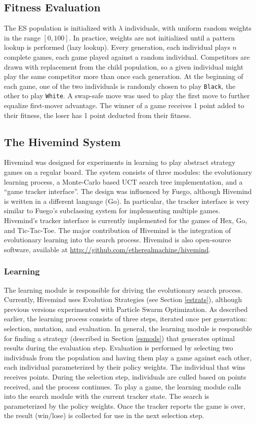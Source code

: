 \documentclass[11pt]{report}
\newcommand{\black}{\texttt{Black}}
\newcommand{\white}{\texttt{White}}
\begin{document}
\subsection{Fitness Evaluation}\label{fitness}
The ES population is initialized with $\lambda$ individuals, with uniform random weights in the range $[0, 100]$. In practice, weights are not initialized until a pattern lookup is performed (lazy lookup). Every generation, each individual plays $n$ complete games, each game played against a random individual. Competitors are drawn with replacement from the child population, so a given individual might play the same competitor more than once each generation. At the beginning of each game, one of the two individuals is randomly chosen to play \black, the other to play \white. A swap-safe move was used to play the first move to further equalize first-mover advantage. The winner of a game receives 1 point added to their fitness, the loser has 1 point deducted from their fitness.

\subsection{The Hivemind System}
Hivemind was designed for experiments in learning to play abstract strategy games on a regular board. The system consists of three modules: the evolutionary learning process, a Monte-Carlo based UCT search tree implementation, and a ``game tracker interface''. The design was influenced by Fuego, although Hivemind is written in a different language (Go). In particular, the tracker interface is very similar to Fuego's subclassing system for implementing multiple games\cite{Fuego}. Hivemind's tracker interface is currently implemented for the games of Hex, Go, and Tic-Tac-Toe. The major contribution of Hivemind is the integration of evolutionary learning into the search process. Hivemind is also open-source software, available at \url{http://github.com/etherealmachine/hivemind}.

\subsubsection{Learning}
The learning module is responsible for driving the evolutionary search process. Currently, Hivemind uses Evolution Strategies (see Section \ref{estrats}), although previous versions experimented with Particle Swarm Optimization. As described earlier, the learning process consists of three steps, iterated once per generation: selection, mutation, and evaluation. In general, the learning module is responsible for finding a strategy (described in Section \ref{esmods}) that generates optimal results during the evaluation step. Evaluation is performed by selecting two individuals from the population and having them play a game against each other, each individual parameterized by their policy weights. The individual that wins receives points. During the selection step, individuals are culled based on points received, and the process continues. To play a game, the learning module calls into the search module with the current tracker state. The search is parameterized by the policy weights. Once the tracker reports the game is over, the result (win/lose) is collected for use in the next selection step.
\end{document}
